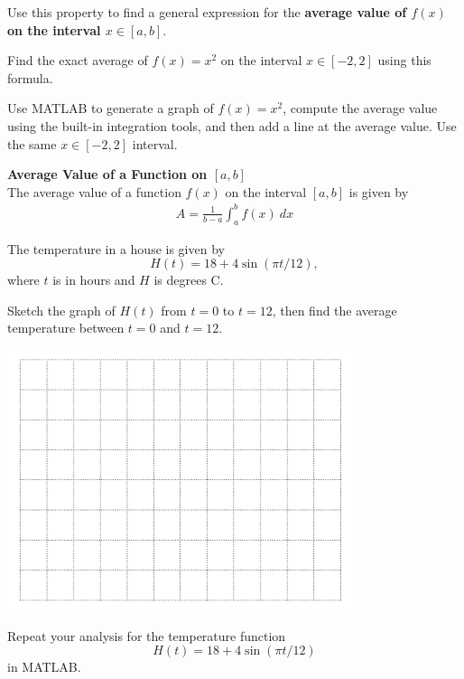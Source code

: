 \problem Use this property to find a general expression for the
  {\bf average value of $f(x)$ on the interval $x \in [a, b]$}.

\vfill

\newpage

\problem Find the exact average of $f(x) = x^2$ on the interval $x \in
  [-2, 2]$ using this formula.

\vfill

\newpage 
\problem Use MATLAB to generate a graph of $f(x) = x^2$, compute the
average value using the built-in integration tools, and then add a
line at the average value.  Use the same $x \in [-2, 2]$ interval.

\newpage


\begin{boxnote}
  {\bf Average Value of a Function on $[a, b]$} \\
The average value of a function $f(x)$ on the interval $[a, b]$ is given by 
\begin{align*}
A = \frac{1}{b-a} \int_a^b f(x)~dx 
\end{align*}
\end{boxnote}


\newpage

The temperature in a house is given by $$H(t) = 18 + 4
  \sin(\pi t/12),$$ where $t$ is in hours and $H$ is degrees C.  

  \problem Sketch the graph of $H(t)$ from $t=0$ to $t=12$, then find
  the average temperature between $t=0$ and $t=12$.

\hfill \includegraphics[width=4in]{graphics/empty_graph_wide_12}

\vfill
\vfill

\newpage 
\problem Repeat your analysis for the temperature function
$$H(t) = 18 + 4 \sin(\pi t/12)$$ in MATLAB.  

